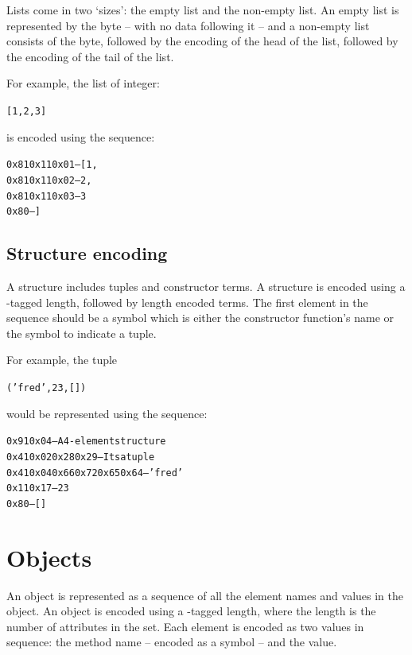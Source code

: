 Lists come in two `sizes': the empty list and the non-empty list. An empty list is represented by the  byte -- with no data following it -- and a non-empty list consists of the  byte, followed by the encoding of the head of the list, followed by the encoding of the tail of the list.

For example, the list of integer:
\begin{alltt}
[1,2,3]
\end{alltt}
is encoded using the sequence:
\begin{alltt}
0x81 0x11 0x01                              -- [1,
     0x81 0x11 0x02                         --  2,
          0x81 0x11 0x03                    --  3
               0x80                         --  ]
\end{alltt}

\subsection{Structure encoding}
\label{encoded:structure}

A structure includes tuples and constructor terms. A structure is encoded using a -tagged length, followed by length encoded terms. The first element in the sequence should be a symbol which is either the constructor function's name or the symbol \q{()} to indicate a tuple.


For example, the \go tuple
\begin{alltt}
('fred', 23, [])
\end{alltt}

would be represented using the sequence:
\begin{alltt}
0x91 0x04                       -- A 4-element structure
  0x41 0x02 0x28 0x29           -- Its a tuple
  0x41 0x04 0x66 0x72 0x65 0x64 -- 'fred'
  0x11 0x17                     -- 23
  0x80                          -- []
\end{alltt}


\section{Objects}
\label{encoded:objects}

An object is represented as a sequence of all the element names and values in the object. An object is encoded using a -tagged length, where the length is the number of attributes in the set. Each element is encoded as two values in sequence: the method name -- encoded as a symbol -- and the value.

